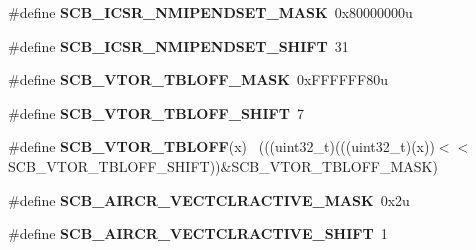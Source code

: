 \begin{DoxyCompactItemize}
\item 
\hypertarget{group___s_c_b___register___masks_gab2a6cb5708895a81ec8826b8fa546145}{}\#define {\bfseries S\+C\+B\+\_\+\+I\+C\+S\+R\+\_\+\+N\+M\+I\+P\+E\+N\+D\+S\+E\+T\+\_\+\+M\+A\+S\+K}~0x80000000u\label{group___s_c_b___register___masks_gab2a6cb5708895a81ec8826b8fa546145}

\item 
\hypertarget{group___s_c_b___register___masks_ga8a185fc794df7e755e5f3a8b3a06d042}{}\#define {\bfseries S\+C\+B\+\_\+\+I\+C\+S\+R\+\_\+\+N\+M\+I\+P\+E\+N\+D\+S\+E\+T\+\_\+\+S\+H\+I\+F\+T}~31\label{group___s_c_b___register___masks_ga8a185fc794df7e755e5f3a8b3a06d042}

\item 
\hypertarget{group___s_c_b___register___masks_ga07fd57e90baff628af14394c8142dc27}{}\#define {\bfseries S\+C\+B\+\_\+\+V\+T\+O\+R\+\_\+\+T\+B\+L\+O\+F\+F\+\_\+\+M\+A\+S\+K}~0x\+F\+F\+F\+F\+F\+F80u\label{group___s_c_b___register___masks_ga07fd57e90baff628af14394c8142dc27}

\item 
\hypertarget{group___s_c_b___register___masks_gac6092f3c78a9f126c2d02740a7976708}{}\#define {\bfseries S\+C\+B\+\_\+\+V\+T\+O\+R\+\_\+\+T\+B\+L\+O\+F\+F\+\_\+\+S\+H\+I\+F\+T}~7\label{group___s_c_b___register___masks_gac6092f3c78a9f126c2d02740a7976708}

\item 
\hypertarget{group___s_c_b___register___masks_ga0fc8974ae1755bc9819c97712403b828}{}\#define {\bfseries S\+C\+B\+\_\+\+V\+T\+O\+R\+\_\+\+T\+B\+L\+O\+F\+F}(x)                                          ~(((uint32\+\_\+t)(((uint32\+\_\+t)(x))$<$$<$S\+C\+B\+\_\+\+V\+T\+O\+R\+\_\+\+T\+B\+L\+O\+F\+F\+\_\+\+S\+H\+I\+F\+T))\&S\+C\+B\+\_\+\+V\+T\+O\+R\+\_\+\+T\+B\+L\+O\+F\+F\+\_\+\+M\+A\+S\+K)\label{group___s_c_b___register___masks_ga0fc8974ae1755bc9819c97712403b828}

\item 
\hypertarget{group___s_c_b___register___masks_ga185d1b709217248a97734877cf639eac}{}\#define {\bfseries S\+C\+B\+\_\+\+A\+I\+R\+C\+R\+\_\+\+V\+E\+C\+T\+C\+L\+R\+A\+C\+T\+I\+V\+E\+\_\+\+M\+A\+S\+K}~0x2u\label{group___s_c_b___register___masks_ga185d1b709217248a97734877cf639eac}

\item 
\hypertarget{group___s_c_b___register___masks_gacc6a889c36f0c9d996ab29dc076eec6e}{}\#define {\bfseries S\+C\+B\+\_\+\+A\+I\+R\+C\+R\+\_\+\+V\+E\+C\+T\+C\+L\+R\+A\+C\+T\+I\+V\+E\+\_\+\+S\+H\+I\+F\+T}~1\label{group___s_c_b___register___masks_gacc6a889c36f0c9d996ab29dc076eec6e}


\end{DoxyCompactItemize}
